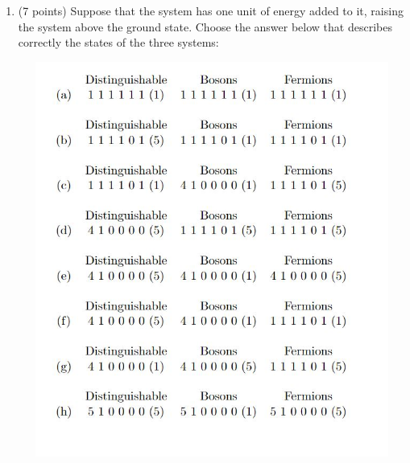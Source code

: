 \documentclass[fleqn]{article}
\begin{document}
\begin{enumerate}
    \pagebreak

    \item (7 points) Suppose that the system has one unit of energy added to it, raising the system above
    the ground state. Choose the answer below that describes correctly the states of the three
    systems:
    \begin{center}
      \includegraphics[height=13cm, width=16cm]{2.JPG}
    \end{center}

    \pagebreak


\end{enumerate}
\end{document}
